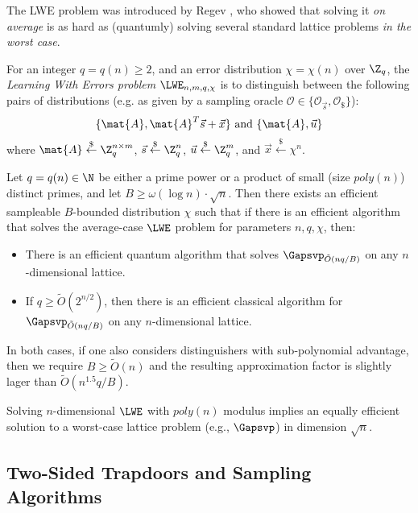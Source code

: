 The LWE problem was introduced by Regev \cite{STOC:Regev05}, who showed that solving it \emph{on average} is
as hard as (quantumly) solving several standard lattice problems \emph{in the worst case}.
\begin{definition}[LWE]\label{defn:lwe}
For an integer $q = q(n) \geq 2$, and an error distribution $\chi = \chi(n)$ over $\Z_q$, the \emph{Learning With Errors problem $\LWE_{n, m, q, \chi}$} is to distinguish between the following pairs of distributions (e.g. as given by a sampling oracle $\mathcal{O}\in\{\mathcal{O}_{\vec{s}}, \mathcal{O}_{\$}\}$):
$$\{\mat{A}, \mat{A}^{T}\vec{s} + \vec{x}\} \  \text{and} \ \{\mat{A}, \vec{u}\}$$
where $\mat{A} \overset{\$}{\leftarrow}\Z^{n \times m}_q$, $\vec{s} \overset{\$}{\leftarrow} \Z^n_q$, $\vec{u} \overset{\$}{\leftarrow} \Z^m_q$, and $\vec{x} \overset{\$}{\leftarrow} \chi^n$.
\end{definition}
\begin{theorem}
Let $q=q(n) \in \N$ be either a prime power or a product of small (size $poly(n)$) distinct primes, and let $B \geq \omega(\log n)\cdot \sqrt{n}$. Then there exists an efficient sampleable $B$-bounded distribution $\chi$ such that if there is an efficient algorithm that solves the average-case $\LWE$ problem for parameters $n, q, \chi$, then:
\begin{itemize}
 \item There is an efficient quantum algorithm that solves $\Gapsvp_{\tilde{O}(nq/B)}$ on any $n$-dimensional lattice.
 \item If $q\geq \tilde{O}(2^{n/2})$, then there is an efficient classical algorithm for $\Gapsvp_{\tilde{O}(nq/B)}$ on any $n$-dimensional lattice.
\end{itemize}
In both cases, if one also considers distinguishers with sub-polynomial advantage, then we require $B\geq \tilde{O}(n)$ and the resulting approximation factor is slightly lager than $\tilde{O}(n^{1.5}q/B)$.
\end{theorem}
\begin{theorem}
Solving $n$-dimensional $\LWE$ with $poly(n)$ modulus implies an equally efficient solution to a worst-case lattice problem (e.g., $\Gapsvp$) in dimension $\sqrt{n}$.
\end{theorem}

\subsection{Two-Sided Trapdoors and Sampling Algorithms}

